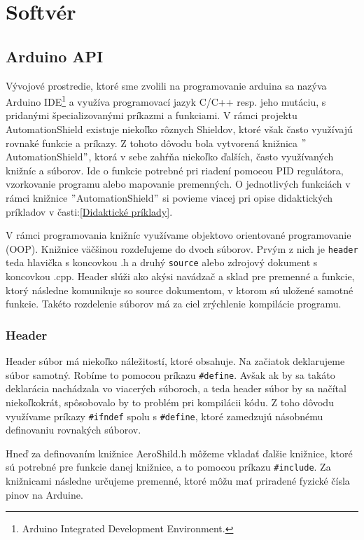 \section{Softvér}
\subsection{Arduino API}
\label{ArduinoLib}

Vývojové prostredie, ktoré sme zvolili na programovanie arduina sa nazýva Arduino IDE\footnote[5]{Arduino Integrated Development Environment.} a využíva programovací jazyk C/C++ resp. jeho mutáciu, s pridanými špecializovanými príkazmi a funkciami. V rámci projektu AutomationShield existuje niekoľko rôznych Shieldov, ktoré však často využívajú rovnaké funkcie a príkazy. Z tohoto dôvodu bola vytvorená knižnica $"$AutomationShield$"$, ktorá v sebe zahŕňa niekoľko ďalších, často využívaných knižníc a súborov. Ide o funkcie potrebné pri riadení pomocou PID regulátora, vzorkovanie programu alebo mapovanie premenných. O jednotlivých funkciách v rámci knižnice $"$AutomationShield$"$ si povieme viacej pri opise didaktických príkladov v časti:\ref{Didaktické príklady}.

V rámci programovania knižníc využívame objektovo orientované programovanie \newline (OOP)\cite{oop}. Knižnice väčšinou rozdeľujeme do dvoch súborov. Prvým z nich je \verb|header| teda hlavička s koncovkou .h a druhý \verb|source| alebo zdrojový dokument s koncovkou .cpp. Header slúži ako akýsi navádzač a sklad pre premenné a funkcie, ktorý následne komunikuje so source dokumentom, v ktorom sú uložené samotné funkcie. Takéto rozdelenie súborov má za ciel zrýchlenie kompilácie programu\cite{546521}.


\subsubsection{Header}

Header súbor má niekoľko náležitostí, ktoré obsahuje. Na začiatok deklarujeme súbor samotný. Robíme to pomocou príkazu \verb|#define|. Avšak ak by sa takáto deklarácia nachádzala vo viacerých súboroch, a teda header súbor by sa načítal niekoľkokrát, spôsobovalo by to problém pri kompilácii kódu. Z toho dôvodu využívame príkazy \verb|#ifndef| spolu s \verb|#define|, ktoré zamedzujú násobnému definovaniu rovnakých súborov. 

Hneď za definovaním knižnice AeroShild.h môžeme vkladať ďalšie knižnice, ktoré sú potrebné pre funkcie danej knižnice, a to pomocou príkazu \verb|#include|. Za knižnicami následne určujeme premenné, ktoré môžu mať priradené fyzické čísla pinov na Arduine. 

